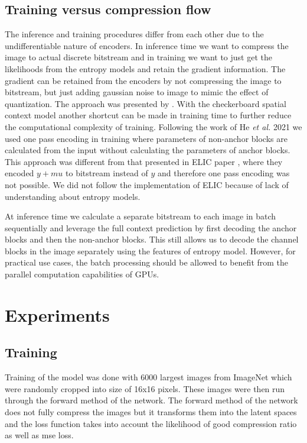 \documentclass{article}
\begin{document}
\subsection{Training versus compression flow}
The inference and training procedures differ from each other due to the undifferentiable nature of encoders. In inference time we want to compress the image to actual discrete bitstream and in training we want to just get the likelihoods from the entropy models and retain the gradient information. The gradient can be retained from the encoders by not compressing the image to bitstream, but just adding gaussian noise to image to mimic the effect of quantization. The approach was presented by \cite{balle2016}. 
With the checkerboard spatial context model another shortcut can be made in training time to further reduce the computational complexity of training. Following the work of He \textit{et al.} 2021 \cite{checkerboard} we used one pass encoding in training where parameters of non-anchor blocks are calculated from the input without calculating the parameters of anchor blocks. This approach was different from that presented in ELIC paper \cite{ELIC}, where they encoded $y+mu$ to bitstream instead of $y$ and therefore one pass encoding was not possible. We did not follow the implementation of ELIC because of lack of understanding about entropy models.

At inference time we calculate a separate bitstream to each image in batch sequentially and leverage the full context prediction by first decoding the anchor blocks and then the non-anchor blocks. This still allows us to decode the channel blocks in the image separately using the features of entropy model. However, for practical use cases, the batch processing should be allowed to benefit from the parallel computation capabilities of GPUs.

\section{Experiments}
\label{sec:experiments}
\subsection{Training} %
\label{sec:training}

Training of the model was done with 6000 largest images from ImageNet \cite{imagenet} which were randomly cropped into size of 16x16 pixels.
These images were then run through the forward method of the network.
The forward method of the network does not fully compress the images but it transforms them into the latent spaces and the loss function takes into account the likelihood of good compression ratio as well as mse loss.
\end{document}
